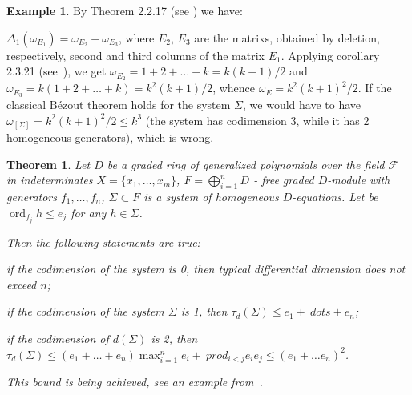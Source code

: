 \documentclass[a4paper,reqno,12pt]{amsart}
\theoremstyle{plain}
\newtheorem{theorem}{Theorem}
\theoremstyle{remark}
\theoremstyle{definition}
\newtheorem{example}{Example}
\renewcommand{\le}{\leqslant}
\DeclareMathOperator {\ord}{ord}
\def\ord{\operatorname{ord}}
\def\F{\mathcal {F}}
\begin{document}
\begin{example}
By Theorem 2.2.17 (see \cite {KLMP}) we have:
  
$\Delta_1(\omega_{E_1})=\omega_{E_2}+
\omega_{E_3}$, where $E_2$, $E_3$ are the matrixs, 
obtained by 
deletion, respectively,
second and third columns of the matrix $E_1$.
Applying corollary 2.3.21 (see~\cite {KLMP}),
we get 
 $\omega_{E_2}=1+2+
\dots+k=k(k+1)/2$ and 
$\omega_{E_3}=k(1+2+\dots+k)=k^2(k+1)/2$,
whence  $\omega_E=k^2(k+1)^2/2$.
If the classical B\'ezout theorem holds for the system $\Sigma$,
we would have to have $\omega_{[\Sigma]} = k^2 (k + 1)^2/2 \leq k^3$
(the system has codimension 3, while it has 2 homogeneous generators),
which is wrong.
\end{example}

\begin{theorem}\label{prim}
Let $D$ be a graded
ring of generalized polynomials over the field $\F$ in indeterminates
$X =\{x_1, \dots, x_m \}$,
$F = \bigoplus_{i = 1}^nD $ - free graded
$D$-module with generators $f_1, \dots, f_n $,
$\Sigma \subset F $ is a system of   homogeneous
 $D$-equations.   Let be   
$\ord_ {f_j} h \le e_j $ for any $h \in \Sigma $.

Then the following statements are true:

if the codimension of the system is 0, then
typical differential dimension 
 does not exceed $n$;

if the codimension of the system $ \Sigma $ is 1, then
$ \tau_d (\Sigma) \le e_1 + \ dots + e_n $;

if the codimension of $ d(\Sigma) $ is 2, then
$\tau_d (\Sigma) \le (e_1 + \dots + e_n)
\max_ {i = 1} ^ ne_i + \ prod_ {i <j} e_ie_j 
\le (e_1 + \dots e_n)^2$.

This bound is being achieved, see an example from~\cite{Kondr1}.
\end{theorem}
\end{document}
